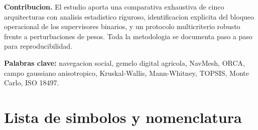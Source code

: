 \documentclass[12pt,a4paper,oneside]{book}
\begin{document}
\noindent
\textbf{Contribucion.} El estudio aporta una comparativa exhaustiva de cinco arquitecturas con analisis estadistico riguroso, identificacion explicita del bloqueo operacional de los supervisores binarios, y un protocolo multicriterio robusto frente a perturbaciones de pesos. Toda la metodologia se documenta paso a paso para reproducibilidad.

\noindent
\textbf{Palabras clave:} navegacion social, gemelo digital agricola, NavMesh, ORCA, campo gaussiano anisotropico, Kruskal-Wallis, Mann-Whitney, TOPSIS, Monte Carlo, ISO 18497.

\newpage

\chapter*{Lista de simbolos y nomenclatura}
\end{document}
